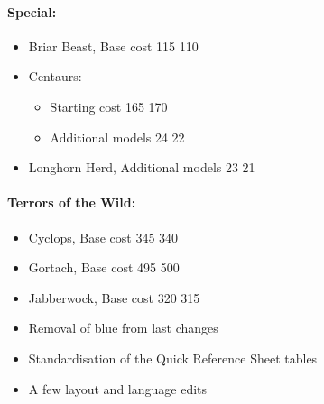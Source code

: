 \begin{multicols}{2}
\paragraph{Special:}
\begin{itemize}
	\item Briar Beast, Base cost 115 \costdown{} 110
	\item Centaurs:
	\begin{itemize}		 
		\item Starting cost 165 \costup{} 170
		\item Additional models 24 \costdown{} 22
	\end{itemize}		
	\item Longhorn Herd, Additional models 23 \costdown{} 21
\end{itemize}
\paragraph{Terrors of the Wild:}
\begin{itemize}
	\item Cyclops, Base cost 345 \costdown{} 340
	\item Gortach, Base cost 495 \costup{} 500
	\item Jabberwock, Base cost 320 \costdown{} 315
\end{itemize}
\end{multicols}

\subtitle{beta 2.1.5}

\begin{itemize}
\item Removal of blue from last changes
\item Standardisation of the Quick Reference Sheet tables
\item A few layout and language edits
\end{itemize}
